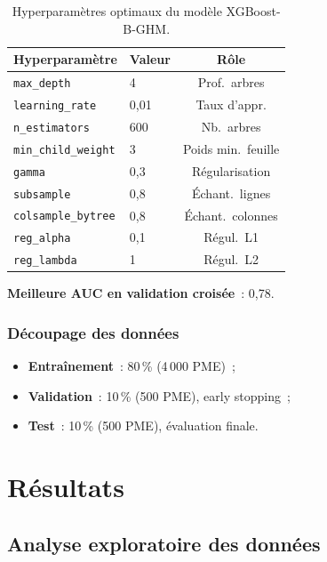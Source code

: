 \documentclass[12pt, a4paper, twocolumn]{article}
\begin{document}
\begin{table}[htbp]
\centering
\caption{Hyperparamètres optimaux du modèle XGBoost-B-GHM.}
\label{tab:hyperparams}
\small
\begin{tabularx}{\columnwidth}{@{}Xlc@{}}
\toprule
\textbf{Hyperparamètre} & \textbf{Valeur} & \textbf{Rôle} \\
\midrule
\texttt{max\_depth} & 4 & Prof.\ arbres \\
\texttt{learning\_rate} & 0,01 & Taux d'appr. \\
\texttt{n\_estimators} & 600 & Nb.\ arbres \\
\texttt{min\_child\_weight} & 3 & Poids min.\ feuille \\
\texttt{gamma} & 0,3 & Régularisation \\
\texttt{subsample} & 0,8 & Échant.\ lignes \\
\texttt{colsample\_bytree} & 0,8 & Échant.\ colonnes \\
\texttt{reg\_alpha} & 0,1 & Régul.\ L1 \\
\texttt{reg\_lambda} & 1 & Régul.\ L2 \\
\bottomrule
\end{tabularx}
\end{table}

\textbf{Meilleure AUC en validation croisée}~: 0,78.

\subsubsection{Découpage des données}
\label{subsubsec:split}

\begin{itemize}[leftmargin=*]
  \item \textbf{Entraînement}~: 80\,\% (4\,000 PME)~;
  \item \textbf{Validation}~: 10\,\% (500 PME), early stopping~;
  \item \textbf{Test}~: 10\,\% (500 PME), évaluation finale.
\end{itemize}

\section{Résultats}
\label{sec:resultats}

\subsection{Analyse exploratoire des données}
\label{subsec:eda}
\end{document}
